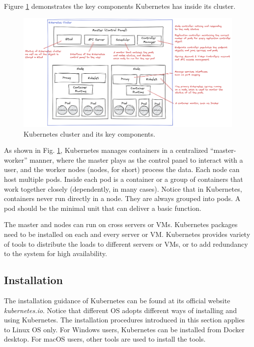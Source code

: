 Figure \ref{ch:vac:fig:kubernetescluster} demonstrates the key components Kubernetes has inside its cluster.
\begin{figure}[htbp]
	\centering
	\includegraphics[width=350pt]{chapters/part-3/figures/kubernetescluster.png}
	\caption{Kubernetes cluster and its key components.} \label{ch:vac:fig:kubernetescluster}
\end{figure}
As shown in Fig. \ref{ch:vac:fig:kubernetescluster}, Kubernetes manages containers in a centralized ``master-worker'' manner, where the master plays as the control panel to interact with a user, and the worker nodes (nodes, for short) process the data. Each node can host multiple pods. Inside each pod is a container or a group of containers that work together closely (dependently, in many cases). Notice that in Kubernetes, containers never run directly in a node. They are always grouped into pods. A pod should be the minimal unit  that can deliver a basic function.

The master and nodes can run on cross servers or VMs. Kubernetes packages need to be installed on each and every server or VM. Kubernetes provides variety of tools to distribute the loads to different servers or VMs, or to add redundancy to the system for high availability.

\subsection{Installation}

The installation guidance of Kubernetes can be found at its official website \textit{kubernetes.io}. Notice that different OS adopts different ways of installing and using Kubernetes. The installation procedures introduced in this section applies to Linux OS only. For Windows users, Kubernetes can be installed from Docker desktop. For macOS users, other tools are used to install the tools.

